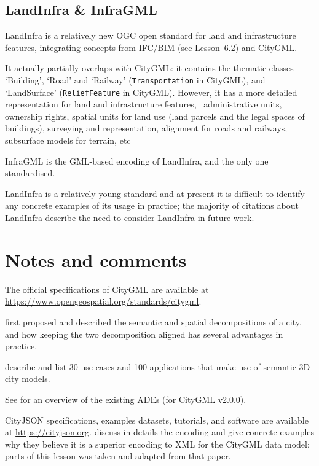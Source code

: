 

\subsection{LandInfra \& InfraGML}

LandInfra is a relatively new OGC open standard for land and infrastructure features, integrating concepts from IFC/BIM (see Lesson~6.2) and CityGML\@.

It actually partially overlaps with CityGML: it contains the thematic classes `Building', `Road' and `Railway' (\texttt{Transportation} in CityGML), and `LandSurface' (\texttt{ReliefFeature} in CityGML). 
However, it has a more detailed representation for land and infrastructure features, \eg\ administrative units, ownership rights, spatial units for land use (land parcels and the legal spaces of buildings), surveying and representation, alignment for roads and railways, subsurface models for terrain, etc

InfraGML is the GML-based encoding of LandInfra, and the only one standardised.

LandInfra is a relatively young standard and at present it is difficult to identify any concrete examples of its usage in practice; the majority of citations about LandInfra describe the need to consider LandInfra in future work.


%
\section{Notes and comments}

The official specifications of CityGML are available at \url{https://www.opengeospatial.org/standards/citygml}.

\citep{Stadler07} first proposed and described the semantic and spatial decompositions of a city, and how keeping the two decomposition aligned has several advantages in practice.

\citet{Biljecki15a} describe and list 30 use-cases and 100 applications that make use of semantic 3D city models.

See \citet{Biljecki18} for an overview of the existing ADEs (for CityGML v2.0.0).

CityJSON specifications, examples datasets, tutorials, and software are available at \url{https://cityjson.org}.
\citet{Ledoux19} discuss in details the encoding and give concrete examples why they believe it is a superior encoding to XML for the CityGML data model; parts of this lesson was taken and adapted from that paper.

